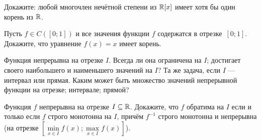 \documentclass[a4paper,12pt]{article}
\begin{document}
 Докажите: любой многочлен неч\"етной степени из $\mathbb{R}[x]$
имеет хотя бы один %
корень из $\mathbb{R}$.

Пусть $f\in C([0;1])$ и все значения функции $f$ содержатся в
отрезке~$[0;1]$. Докажите, что уравнение $f(x)=x$ имеет корень.










 Функция непрерывна на отрезке $I$. Всегда ли она
 ограничена на $I$;
 достигает своего наибольшего и наименьшего значений на $I$?
 Та же задача, если $I$ --- интервал или прямая.
%
 Каким может быть множество значений непрерывной функции на
отрезке; интервале; прямой?




 Функция $f$ непрерывна на отрезке $I\subseteq\mathbb{R}$.
Докажите, что $f$ обратима на $I$ если и только если
$f$ строго монотонна на $I$, прич\"ем $f^{-1}$
строго монотонна и непрерывна (на отрезке %
$[\min\limits_{x\in I} f(x);\max\limits_{x\in I} f(x)]$).
\end{document}
